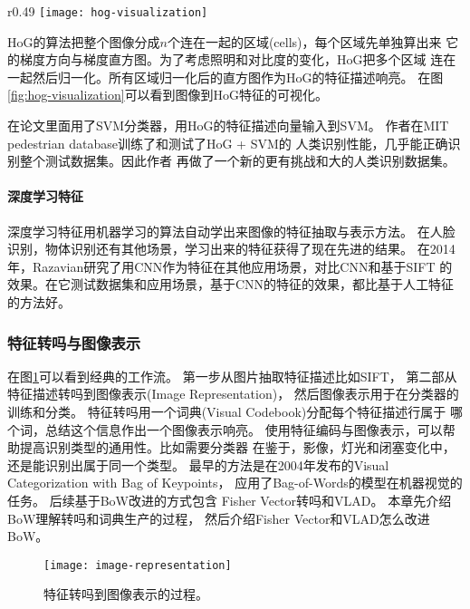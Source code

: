 \begin{wrapfigure}{r}{0.49\textwidth}
  \centering
    \captionsetup{justification=centering}
    \texttt{[image: hog-visualization]}
    \caption{可视化HOG的特征描述。\\
             源：Cornell CS4670}
  \label{fig:hog-visualization}
\end{wrapfigure}
HoG的算法把整个图像分成$n$个连在一起的区域(cells)，每个区域先单独算出来
它的梯度方向与梯度直方图。为了考虑照明和对比度的变化，HoG把多个区域
连在一起然后归一化。所有区域归一化后的直方图作为HoG的特征描述响亮。
在图\ref{fig:hog-visualization}可以看到图像到HoG特征的可视化。

在论文里面用了SVM分类器，用HoG的特征描述向量输入到SVM。
作者在MIT pedestrian database训练了和测试了HoG + SVM的
人类识别性能，几乎能正确识别整个测试数据集。因此作者
再做了一个新的更有挑战和大的人类识别数据集。


\paragraph{深度学习特征}
深度学习特征用机器学习的算法自动学出来图像的特征抽取与表示方法。
在人脸识别，物体识别还有其他场景，学习出来的特征获得了现在先进的结果。
\cite{taigman2014deepface, krizhevsky2012imagenet}
在2014年，Razavian研究了用CNN作为特征在其他应用场景，对比CNN和基于SIFT
的效果。在它测试数据集和应用场景，基于CNN的特征的效果，都比基于人工特征的方法好。
\cite{razavian2014cnn}




\subsubsection{特征转吗与图像表示}
在图\ref{fig:image-representation}可以看到经典的工作流。
第一步从图片抽取特征描述比如SIFT，
第二部从特征描述转吗到图像表示(Image Representation)，
然后图像表示用于在分类器的训练和分类。
特征转吗用一个词典(Visual Codebook)分配每个特征描述行属于
哪个词，总结这个信息作出一个图像表示响亮。
使用特征编码与图像表示，可以帮助提高识别类型的通用性。比如需要分类器
在鉴于，影像，灯光和闭塞变化中，还是能识别出属于同一个类型。
最早的方法是在2004年发布的Visual Categorization with Bag of Keypoints，
应用了Bag-of-Words的模型在机器视觉的任务。\cite{csurka2004visual}
后续基于BoW改进的方式包含 Fisher Vector转吗和VLAD。
\cite{perronnin2007fisher,jegou2010vlad}本章先介绍BoW理解转吗和词典生产的过程，
然后介绍Fisher Vector和VLAD怎么改进BoW。
\begin{figure}
  \centering
    \texttt{[image: image-representation]}
    \caption{特征转吗到图像表示的过程。}
  \label{fig:image-representation}
\end{figure}

